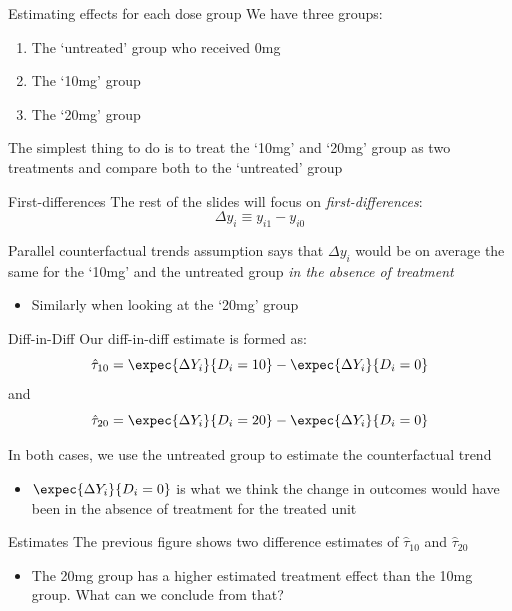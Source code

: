 \documentclass[aspectratio=169,t]{beamer}
\begin{document}
\begin{frame}{Estimating effects for each dose group}
  We have three groups:
  \begin{enumerate}
    \item The `untreated' group who received 0mg

    \item The `10mg' group

    \item The `20mg' group
  \end{enumerate}

  \bigskip
  The simplest thing to do is to treat the `10mg' and `20mg' group as two treatments and compare both to the `untreated' group
\end{frame}

\begin{frame}{First-differences}
  The rest of the slides will focus on \emph{first-differences}:
  $$
    \Delta y_i \equiv y_{i1} - y_{i0}
  $$

  \bigskip
  Parallel counterfactual trends assumption says that $\Delta y_i$ would be on average the same for the `10mg' and the untreated group \emph{in the absence of treatment}
  \begin{itemize}
    \item Similarly when looking at the `20mg' group
  \end{itemize}
\end{frame}


\begin{frame}{Diff-in-Diff}
  Our diff-in-diff estimate is formed as:
  $$
    \hat{\tau}_{10} = \expec{\Delta Y_i}{D_i = 10} - \expec{\Delta Y_i}{D_i = 0}
  $$
  and
  $$
    \hat{\tau}_{20} = \expec{\Delta Y_i}{D_i = 20} - \expec{\Delta Y_i}{D_i = 0}
  $$

  \bigskip
  In both cases, we use the untreated group to estimate the counterfactual trend
  \begin{itemize}
    \item $\expec{\Delta Y_i}{D_i = 0}$ is what we think the change in outcomes would have been in the absence of treatment for the treated unit
  \end{itemize}
\end{frame}


\begin{frame}{Estimates}
  The previous figure shows two difference estimates of $\hat{\tau}_{10}$ and $\hat{\tau}_{20}$
  \begin{itemize}
    \item The 20mg group has a higher estimated treatment effect than the 10mg group. What can we conclude from that?
  \end{itemize}
\end{frame}
\end{document}
